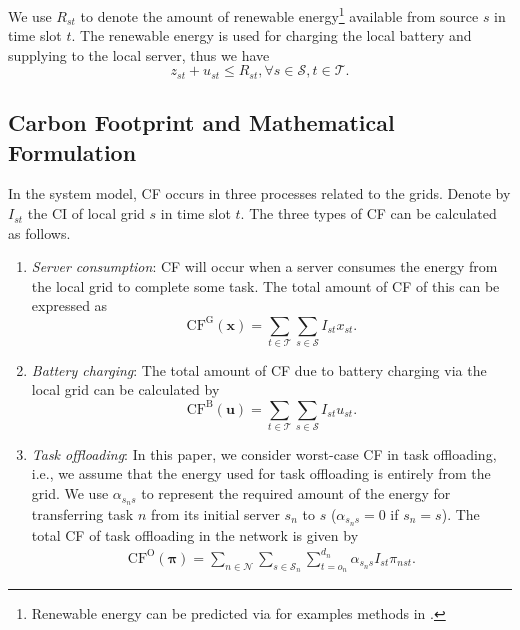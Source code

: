 \documentclass[conference, 10pt, ﬁnal, letterpaper, twocolumn]{IEEEtran}
\begin{document}
We use $R_{st}$ to denote the amount of renewable energy\footnote{Renewable energy can be predicted via for examples methods in \cite{li2019renewable}.} available from source $s$ in time slot $t$. The renewable energy is used for charging the local battery and supplying to the local server, thus we have  
\begin{equation}\label{c5}
    z_{st} + u_{st} \leq R_{st}, \forall s \in \mathcal{S}, t \in \mathcal{T}.
\end{equation}

\subsection{Carbon Footprint and Mathematical Formulation} \label{subsec:CFA}

In the system model, CF occurs in three processes related to the grids. Denote by $I_{st}$ the CI of local grid $s$ in time slot $t$. The three types of CF can be calculated as follows.
\begin{enumerate}
    \item {\em Server consumption}: CF will occur when a server consumes the energy from the local grid to complete some task. The total amount of CF of this can be expressed as
    \begin{equation}\label{th}
        \text{CF}^{\text{G}}(\boldsymbol{x}) = \sum_{t \in \mathcal{T}} \sum_{s\in \mathcal{S}} I_{st}x_{st}.
    \end{equation}
    \item {\em Battery charging}: The total amount of CF due to battery charging via the local grid can be calculated by
    \begin{equation}\label{bc}
        \text{CF}^{\text{B}}(\boldsymbol{u}) = \sum_{t \in \mathcal{T}} \sum_{s\in \mathcal{S}} I_{st}u_{st}.
    \end{equation}
    \item {\em Task offloading}: In this paper, we consider worst-case CF in task offloading, i.e., we assume that the energy used for task offloading is entirely from the grid. We use $\alpha_{s_n s}$ to represent the required amount of the energy for transferring task $n$ from its initial server $s_n$ to $s$ ($\alpha_{s_n s} = 0$ if $s_n = s$). The total CF of task offloading in the network is given by
    \begin{align}\label{tt}
        \text{CF}^{\text{O}}(\boldsymbol{\pi}) =  \sum_{n \in \mathcal{N}} \sum_{s \in \mathcal{S}_n}  \sum^{d_n}_{t = o_n} \alpha_{s_n s} I_{st}  \pi_{nst}.
    \end{align}
\end{enumerate}
\end{document}
